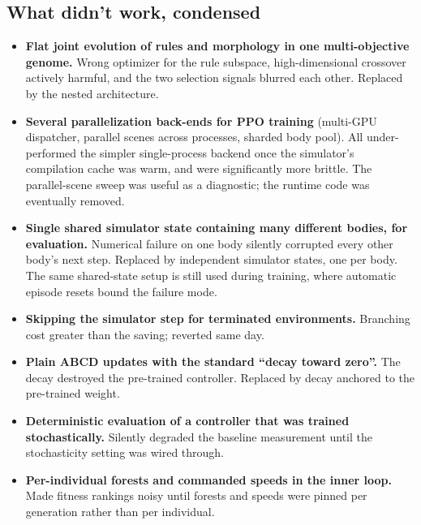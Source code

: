 \documentclass[letterpaper,10pt]{article}
\begin{document}
\subsection{What didn't work, condensed}
\begin{itemize}
    \item \textbf{Flat joint evolution of rules and morphology in one multi-objective genome.} Wrong optimizer for the rule subspace, high-dimensional crossover actively harmful, and the two selection signals blurred each other. Replaced by the nested architecture.
    \item \textbf{Several parallelization back-ends for PPO training} (multi-GPU dispatcher, parallel scenes across processes, sharded body pool). All under-performed the simpler single-process backend once the simulator's compilation cache was warm, and were significantly more brittle. The parallel-scene sweep was useful as a diagnostic; the runtime code was eventually removed.
    \item \textbf{Single shared simulator state containing many different bodies, for evaluation.} Numerical failure on one body silently corrupted every other body's next step. Replaced by independent simulator states, one per body. The same shared-state setup is still used during training, where automatic episode resets bound the failure mode.
    \item \textbf{Skipping the simulator step for terminated environments.} Branching cost greater than the saving; reverted same day.
    \item \textbf{Plain ABCD updates with the standard ``decay toward zero''.} The decay destroyed the pre-trained controller. Replaced by decay anchored to the pre-trained weight.
    \item \textbf{Deterministic evaluation of a controller that was trained stochastically.} Silently degraded the baseline measurement until the stochasticity setting was wired through.
    \item \textbf{Per-individual forests and commanded speeds in the inner loop.} Made fitness rankings noisy until forests and speeds were pinned per generation rather than per individual.
\end{itemize}
\end{document}
